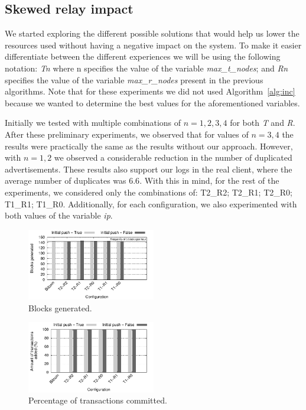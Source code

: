 \documentclass{dads}   %
\begin{document}
\subsection{Skewed relay impact}
\label{sec:sri}
We started exploring the different possible solutions that would help us lower the resources used without having a negative impact on the system. To make it easier differentiate between the different experiences we will be using the following notation: \textsl{Tn} where n specifies the value of the variable \textsl{max\_t\_nodes}; and \textsl{Rn} specifies the value of the variable \textsl{max\_r\_nodes} present in the previous algorithms. Note that for these experiments we did not used Algorithm~\ref{alg:inc} because we wanted to determine the best values for the aforementioned variables.

Initially we tested with multiple combinations of $n={1,2,3,4}$ for both \textsl{T} and \textsl{R}. After these preliminary experiments, we observed that for values of $n={3,4}$ the results were practically the same as the results without our approach. However, with $n={1,2}$ we observed a considerable reduction in the number of duplicated advertisements.
These results also support our logs in the real client, where the average number of duplicates was $6.6$. With this in mind, for the rest of the experiments, we considered only the combinations of: T2\_R2; T2\_R1; T2\_R0; T1\_R1; T1\_R0. Additionally, for each configuration, we also experimented with both values of the variable \textsl{ip}.

\begin{figure}
\centering
\includegraphics[width=0.5\textwidth]{plots/blocks-gen.pdf}
\caption{Blocks generated.}
\label{fig:nb-blocks}
\end{figure}

\begin{figure}
\centering
\includegraphics[width=0.5\textwidth]{plots/tx-added.pdf}
\caption{Percentage of transactions committed.}
\label{fig:tx-added}
\end{figure}
\end{document}
